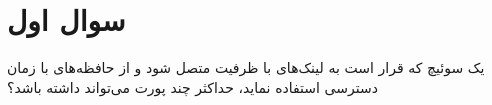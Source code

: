 \section{سوال اول}

یک سوئیچ  که قرار است به لینک‌های  با ظرفیت  متصل شود و از حافظه‌های با زمان دسترسی  استفاده نماید، حداکثر چند پورت می‌تواند داشته باشد؟